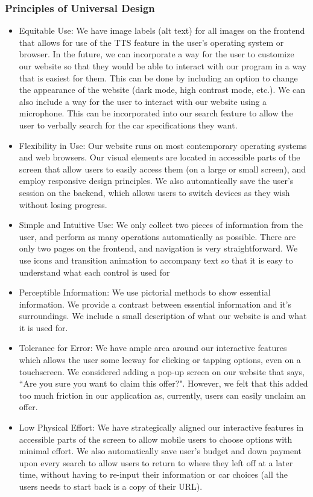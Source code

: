 \documentclass[fontsize=14pt]{article}
\begin{document}
\subsubsection*{Principles of Universal Design}
\begin{itemize}
    \item Equitable Use: We have image labels (alt text) for all images on the frontend that allows for use of the TTS feature in the user's operating system or browser. In the future, we can incorporate a way for the user to customize our website so that they would be able to interact with our program in a way that is easiest for them. This can be done by including an option to change the appearance of the website (dark mode, high contrast mode, etc.). We can also include a way for the user to interact with our website using a microphone. This can be incorporated into our search feature to allow the user to verbally search for the car specifications they want.
    \item Flexibility in Use: Our website runs on most contemporary operating systems and web browsers. Our visual elements are located in accessible parts of the screen that allow users to easily access them (on a large or small screen), and employ responsive design principles. We also automatically save the user's session on the backend, which allows users to switch devices as they wish without losing progress.
    \item Simple and Intuitive Use: We only collect two pieces of information from the user, and perform as many operations automatically as possible. There are only two pages on the frontend, and navigation is very straightforward. We use icons and transition animation to accompany text so that it is easy to understand what each control is used for
    \item Perceptible Information: We use pictorial methods to show essential information. We provide a contrast between essential information and it's surroundings. We include a small description of what our website is and what it is used for. 
    \item Tolerance for Error: We have ample area around our interactive features which allows the user some leeway for clicking or tapping options, even on a touchscreen. We considered adding a pop-up screen on our website that says, ``Are you sure you want to claim this offer?". However, we felt that this added too much friction in our application as, currently, users can easily unclaim an offer.
    \item Low Physical Effort: We have strategically aligned our interactive features in accessible parts of the screen to allow mobile users to choose options with minimal effort. We also automatically save user's budget and down payment upon every search to allow users to return to where they left off at a later time, without having to re-input their information or car choices (all the users needs to start back is a copy of their URL).

\end{itemize}
\end{document}
